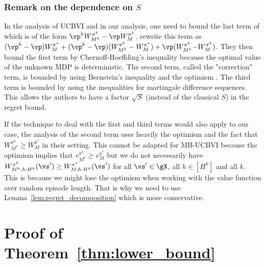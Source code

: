 \begin{subappendices}
\subsubsection{Remark on the dependence on $S$}
\label{sssec:ucbvi_s}

In the analysis of UCBVI and in our analysis, one need to bound the last term of 
which is of the form ${\vp^kW^{\pi^k}_{M^k} -\vp W^{\pi^k}_{M}}$. \cite{azar2017minimax} rewrite this term as
$(\vp^k -\vp)W^{\pi^*}_M +(\vp^k -\vp)(W^{\pi^k}_{M^k} -W^{\pi^*}_M) +\vp(W^{\pi^k}_{M^k} {-}W^{\pi^k}_{M})$.
They then bound the first term by Chernoff-Hoeffding's inequality because the optimal value of the unknown MDP is deterministic.
The second term, called the "correction" term, is bounded by using Bernstein's inequality and the optimism \cite[Step 1, page 6]{azar2017minimax}. The third term is bounded by using the inequalities for martingale difference sequences. This allows the authors to have a factor $\sqrt{S}$ (instead of the classical $S$) in the regret bound.

If the technique to deal with the first and third terms would also apply to our case, the analysis of the second term uses heavily the optimism and the fact that $W^{\pi^k}_{M^k}\ge W^{\pi^*}_{M}$ in their setting. This cannot be adapted for MB-UCBVI because the optimism implies that $v^{\pi^k}_{M^k} \ge v^{\pi^*}_{M}$ but we do not necessarily have $W^{\pi^k}_{M^k,h:H^k}(\vs')\ge W^{\pi^*}_{M,h:H^k}(\vs')$ for all $\vs'\in\gX$, all $h\in[H^k]$ and all $k$. This is because we might lose the optimism when working with the value function over random episode length.
That is why we need to use Lemma~\ref{lem:regret_decomposition} which is more conservative.

\section{Proof of Theorem~\ref{thm:lower_bound}}
\label{apx:sketch_of_proof_lower}


\end{subappendices}
